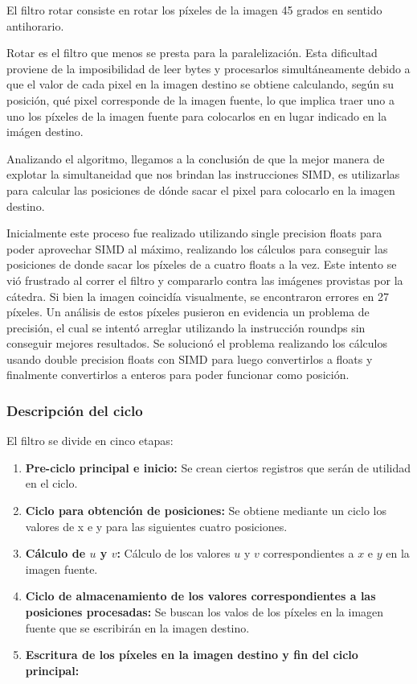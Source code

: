 El filtro rotar consiste en rotar los píxeles de la imagen 45 grados en sentido antihorario.

Rotar es el filtro que menos se presta para la paralelización. Esta dificultad proviene de la imposibilidad de leer bytes y procesarlos simultáneamente debido a que el valor de cada pixel en la imagen destino se obtiene calculando, según su posición, qué pixel corresponde de la imagen fuente, lo que implica traer uno a uno los píxeles de la imagen fuente para colocarlos en en lugar indicado en la imágen destino.

Analizando el algoritmo, llegamos a la conclusión de que la mejor manera de explotar la simultaneidad que nos brindan las instrucciones SIMD, es utilizarlas para calcular las posiciones de dónde sacar el pixel para colocarlo en la imagen destino. 

Inicialmente este proceso fue realizado utilizando single precision floats para poder aprovechar SIMD al máximo, realizando los cálculos para conseguir las posiciones de donde sacar los píxeles de a cuatro floats a la vez. Este intento se vió frustrado al correr el filtro y compararlo contra las imágenes provistas por la cátedra. Si bien la imagen coincidía visualmente, se encontraron errores en 27 píxeles. Un análisis de estos píxeles pusieron en evidencia un problema de precisión, el cual se intentó arreglar utilizando la instrucción roundps sin conseguir mejores resultados. Se solucionó el problema realizando los cálculos usando double precision floats con SIMD para luego convertirlos a floats y finalmente convertirlos a enteros para poder funcionar como posición.


\subsubsection{Descripción del ciclo}

El filtro se divide en cinco etapas:

\begin{enumerate}
\item \textbf{Pre-ciclo principal e inicio:} Se crean ciertos registros que serán de utilidad en el ciclo.
\item \textbf{Ciclo para obtención de posiciones:} Se obtiene mediante un ciclo los valores de x e y para las siguientes cuatro posiciones.
\item \textbf{Cálculo de $u$ y $v$:} Cálculo de los valores $u$ y $v$ correspondientes a $x$ e $y$ en la imagen fuente.
\item \textbf{Ciclo de almacenamiento de los valores correspondientes a las posiciones procesadas:} Se buscan los valos de los píxeles en la imagen fuente que se escribirán en la imagen destino.
\item \textbf{Escritura de los píxeles en la imagen destino y fin del ciclo principal:}
\end{enumerate}


